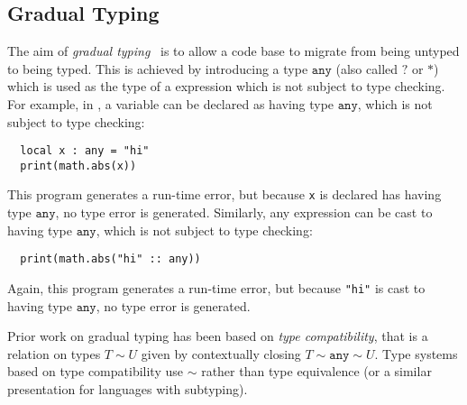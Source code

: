 \documentclass[acmsmall,review,screen]{acmart}
\newcommand{\ANY}{\mathtt{any}}
\newcommand{\compat}{\sim}
\begin{document}
\subsection{Gradual Typing}

The aim of \emph{gradual
typing}~\cite{ST06:GradualTyping,ST07:GradualTyping} is to allow a
code base to migrate from being untyped to being typed.  This is
achieved by introducing a type $\ANY$ (also called $?$ or $*$) which
is used as the type of a expression which is not subject to type
checking. For example, in , a variable can be declared as
having type $\ANY$, which is not subject to type checking:
\begin{verbatim}
  local x : any = "hi"
  print(math.abs(x))
\end{verbatim}
This program generates a run-time error, but because \verb|x| is
declared has having type $\ANY$, no type error is generated.
Similarly, any expression can be cast to having type $\ANY$, which is
not subject to type checking:
\begin{verbatim}
  print(math.abs("hi" :: any))
\end{verbatim}
Again, this program generates a run-time error, but because \verb|"hi"| is
cast to  having type $\ANY$, no type error is generated.

Prior work on gradual typing has been based on \emph{type
compatibility}, that is a relation on types $T \compat U$ given by
contextually closing $T \compat \ANY \compat U$.  Type systems based
on type compatibility use $\compat$ rather than type equivalence (or a
similar presentation for languages with subtyping).
\end{document}
